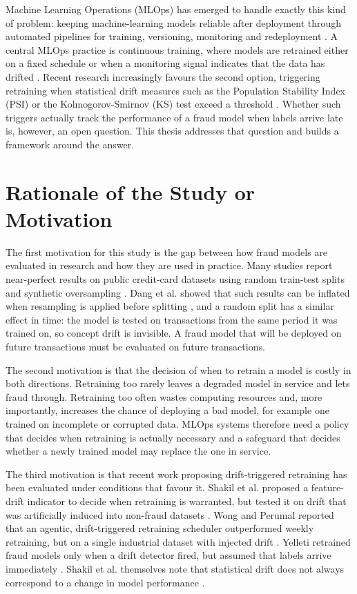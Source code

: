 Machine Learning Operations (MLOps) has emerged to handle exactly this kind of problem: keeping machine-learning models reliable after deployment through automated pipelines for training, versioning, monitoring and redeployment \cite{pulicharla2019,kodakandla2024}. A central MLOps practice is continuous training, where models are retrained either on a fixed schedule or when a monitoring signal indicates that the data has drifted \cite{pulicharla2019}. Recent research increasingly favours the second option, triggering retraining when statistical drift measures such as the Population Stability Index (PSI) or the Kolmogorov-Smirnov (KS) test exceed a threshold \cite{shakil2025,wong2025}. Whether such triggers actually track the performance of a fraud model when labels arrive late is, however, an open question. This thesis addresses that question and builds a framework around the answer.

\section{Rationale of the Study or Motivation}

The first motivation for this study is the gap between how fraud models are evaluated in research and how they are used in practice. Many studies report near-perfect results on public credit-card datasets using random train-test splits and synthetic oversampling \cite{mienye2023}. Dang et al. showed that such results can be inflated when resampling is applied before splitting \cite{dang2021}, and a random split has a similar effect in time: the model is tested on transactions from the same period it was trained on, so concept drift is invisible. A fraud model that will be deployed on future transactions must be evaluated on future transactions.

The second motivation is that the decision of when to retrain a model is costly in both directions. Retraining too rarely leaves a degraded model in service and lets fraud through. Retraining too often wastes computing resources and, more importantly, increases the chance of deploying a bad model, for example one trained on incomplete or corrupted data. MLOps systems therefore need a policy that decides when retraining is actually necessary and a safeguard that decides whether a newly trained model may replace the one in service.

The third motivation is that recent work proposing drift-triggered retraining has been evaluated under conditions that favour it. Shakil et al. proposed a feature-drift indicator to decide when retraining is warranted, but tested it on drift that was artificially induced into non-fraud datasets \cite{shakil2025}. Wong and Perumal reported that an agentic, drift-triggered retraining scheduler outperformed weekly retraining, but on a single industrial dataset with injected drift \cite{wong2025}. Yelleti retrained fraud models only when a drift detector fired, but assumed that labels arrive immediately \cite{yelleti2025}. Shakil et al. themselves note that statistical drift does not always correspond to a change in model performance \cite{shakil2025}.


